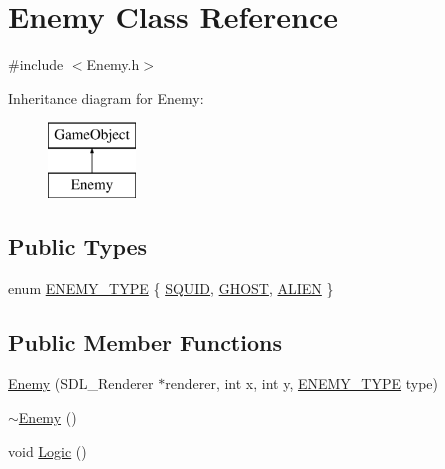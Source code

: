 \hypertarget{class_enemy}{}\section{Enemy Class Reference}
\label{class_enemy}


{\ttfamily \#include $<$Enemy.\+h$>$}

Inheritance diagram for Enemy\+:\begin{figure}[H]
\begin{center}
\leavevmode
\includegraphics[height=2.000000cm]{class_enemy}
\end{center}
\end{figure}
\subsection*{Public Types}
\begin{DoxyCompactItemize}
\item 
enum \mbox{\hyperlink{class_enemy_ae6c971b1c4da1335dfd6542dea6efecb}{E\+N\+E\+M\+Y\+\_\+\+T\+Y\+PE}} \{ \mbox{\hyperlink{class_enemy_ae6c971b1c4da1335dfd6542dea6efecbaa842e3e91308061ef257ce005b8426be}{S\+Q\+U\+ID}}, 
\mbox{\hyperlink{class_enemy_ae6c971b1c4da1335dfd6542dea6efecba57bf1820642551b8e2e260613b8dce50}{G\+H\+O\+ST}}, 
\mbox{\hyperlink{class_enemy_ae6c971b1c4da1335dfd6542dea6efecbaaf4e9f1052313811c191ab9db18005e9}{A\+L\+I\+EN}}
 \}
\end{DoxyCompactItemize}
\subsection*{Public Member Functions}
\begin{DoxyCompactItemize}
\item 
\mbox{\hyperlink{class_enemy_ac14d80ce4f82c579e5fe1406e5bb25fa}{Enemy}} (S\+D\+L\+\_\+\+Renderer $\ast$renderer, int x, int y, \mbox{\hyperlink{class_enemy_ae6c971b1c4da1335dfd6542dea6efecb}{E\+N\+E\+M\+Y\+\_\+\+T\+Y\+PE}} type)
\item 
\mbox{\hyperlink{class_enemy_ac0eec4755e28c02688065f9657150ac3}{$\sim$\+Enemy}} ()
\item 
void \mbox{\hyperlink{class_enemy_adcde768475970dae1e4c3e76fb59bc46}{Logic}} ()
\end{DoxyCompactItemize}
